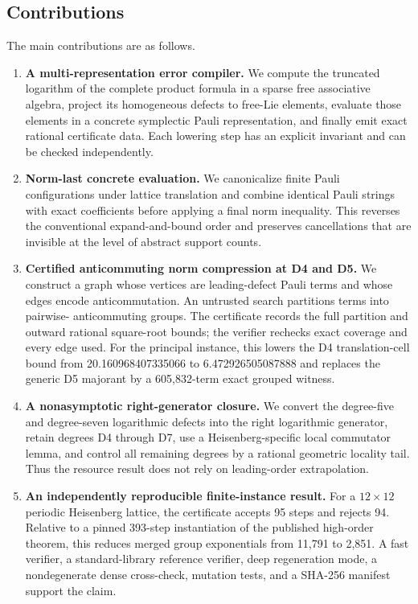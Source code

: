 \subsection{Contributions}

The main contributions are as follows.

\begin{enumerate}
\item \textbf{A multi-representation error compiler.}  We compute the
  truncated logarithm of the complete product formula in a sparse free
  associative algebra, project its homogeneous defects to free-Lie elements,
  evaluate those elements in a concrete symplectic Pauli representation, and
  finally emit exact rational certificate data.  Each lowering step has an
  explicit invariant and can be checked independently.

\item \textbf{Norm-last concrete evaluation.}  We canonicalize finite Pauli
  configurations under lattice translation and combine identical Pauli
  strings with exact coefficients before applying a final norm inequality.
  This reverses the conventional expand-and-bound order and preserves
  cancellations that are invisible at the level of abstract support counts.

\item \textbf{Certified anticommuting norm compression at D4 and D5.}  We construct a
  graph whose vertices are leading-defect Pauli terms and whose edges encode
  anticommutation.  An untrusted search partitions terms into pairwise-
  anticommuting groups.  The certificate records the full partition and
  outward rational square-root bounds; the verifier rechecks exact coverage
  and every edge used.  For the principal instance, this lowers the D4
  translation-cell bound from 20.160968407335066 to 6.472926505087888 and
  replaces the generic D5 majorant by a 605,832-term exact grouped witness.

\item \textbf{A nonasymptotic right-generator closure.}  We convert the
  degree-five and degree-seven logarithmic defects into the right logarithmic
  generator, retain degrees D4 through D7, use a Heisenberg-specific local
  commutator lemma, and control all remaining degrees by a rational geometric
  locality tail.  Thus the resource result does not rely on leading-order
  extrapolation.

\item \textbf{An independently reproducible finite-instance result.}  For a
  $12\times12$ periodic Heisenberg lattice, the certificate accepts 95 steps
  and rejects 94.  Relative to a pinned 393-step instantiation of the
  published high-order theorem, this reduces merged group exponentials from
  11,791 to 2,851.  A fast verifier, a standard-library reference verifier,
  deep regeneration mode, a nondegenerate dense cross-check, mutation tests,
  and a SHA-256 manifest support the claim.
\end{enumerate}

